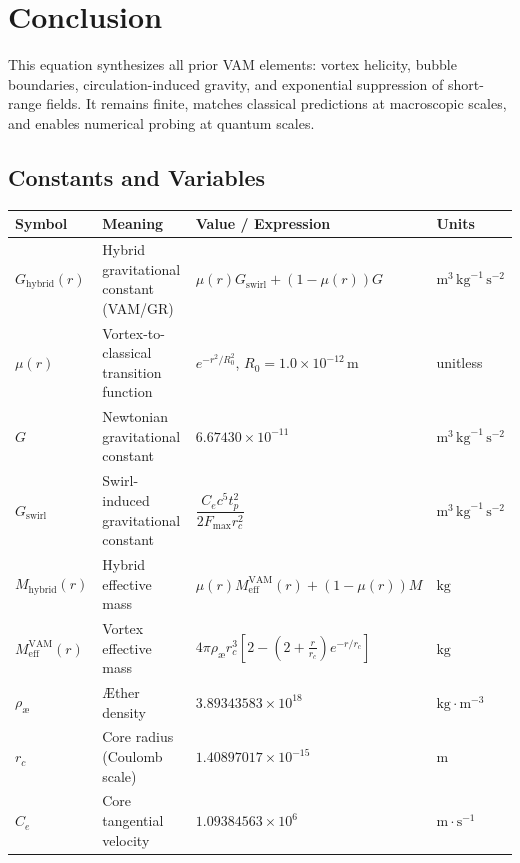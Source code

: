 \section*{Conclusion}
This equation synthesizes all prior VAM elements: vortex helicity, bubble boundaries, circulation-induced gravity, and exponential suppression of short-range fields. It remains finite, matches classical predictions at macroscopic scales, and enables numerical probing at quantum scales.

\subsection{Constants and Variables}

\begin{table}[H]
      \centering
      \footnotesize
      \begin{tabular}{llll}
          \toprule
          \textbf{Symbol} & \textbf{Meaning} & \textbf{Value / Expression} & \textbf{Units} \\
          \midrule
        $G_{\text{hybrid}}(r)$ & Hybrid gravitational constant (VAM/GR) & $\mu(r) G_{\text{swirl}} + (1 - \mu(r)) G$ & $\text{m}^3\,\text{kg}^{-1}\,\text{s}^{-2}$ \\
        $\mu(r)$ & Vortex-to-classical transition function & $e^{-r^2 / R_0^2}$, $R_0 = 1.0 \times 10^{-12}\,\text{m}$ & unitless \\
        $G$ & Newtonian gravitational constant & $6.67430 \times 10^{-11}$ & $\text{m}^3\,\text{kg}^{-1}\,\text{s}^{-2}$ \\
        $G_{\text{swirl}}$ & Swirl-induced gravitational constant & $\dfrac{C_e c^5 t_p^2}{2 F_{\max} r_c^2}$ & $\text{m}^3\,\text{kg}^{-1}\,\text{s}^{-2}$ \\
        $M_{\text{hybrid}}(r)$ & Hybrid effective mass & $\mu(r) M_\text{eff}^\text{VAM}(r) + (1 - \mu(r)) M$ & $\text{kg}$ \\
        $M_\text{eff}^\text{VAM}(r)$ & Vortex effective mass & $4\pi \rho_\text{\ae} r_c^3 \left[ 2 - (2 + \frac{r}{r_c}) e^{-r/r_c} \right]$ & $\text{kg}$ \\
        $\rho_\text{\ae}$ & Æther density & $3.89343583 \times 10^{18}$ & $\text{kg}\cdot\text{m}^{-3}$ \\
        $r_c$ & Core radius (Coulomb scale) & $1.40897017 \times 10^{-15}$ & $\text{m}$ \\
        $C_e$ & Core tangential velocity & $1.09384563 \times 10^{6}$ & $\text{m}\cdot\text{s}^{-1}$ \\

\end{tabular}
\end{table}

